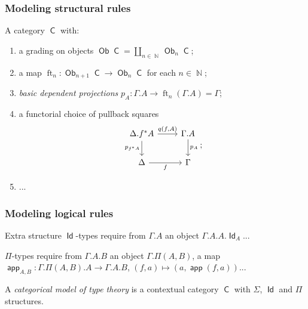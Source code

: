 \documentclass{beamer}
\DeclareMathOperator{\Id}{\mathsf{Id}}
\DeclareMathOperator{\sfC}{\mathsf{C}}
\DeclareMathOperator{\N}{\mathbb{N}}
\DeclareMathOperator{\Ob}{\mathsf{Ob}}
\DeclareMathOperator{\ft}{ft}
\DeclareMathOperator{\app}{\mathsf{app}}
\begin{document}
\begin{frame}
  \frametitle{Modeling structural rules}

  \begin{definition}
    A category $\sfC$ with:
    \begin{enumerate}
      \item a grading on objects $\Ob\sfC=\coprod_{n\in\N}\Ob_n\sfC$;
      \item a map $\ft_n\colon\Ob_{n+1}\sfC\rightarrow\Ob_n\sfC$ for each
        $n\in\N$;
      \item \emph{basic dependent projections}
        $p_A\colon\Gamma.A\rightarrow\ft_n(\Gamma.A)=\Gamma$;
      \item a functorial choice of pullback squares
        \[\begin{tikzcd}[ampersand replacement=\&]
          {\Delta.f^*A} \& {\Gamma.A} \\
          \Delta \& \Gamma
          \arrow["{p_A}", from=1-2, to=2-2]
          \arrow["{p_{f^*A}}"', from=1-1, to=2-1]
          \arrow["{q(f,A)}", from=1-1, to=1-2]
          \arrow["f"', from=2-1, to=2-2]
        \end{tikzcd};\]
      \item ...
    \end{enumerate}
  \end{definition}
\end{frame}

\begin{frame}
  \frametitle{Modeling logical rules}

  \begin{block}{Extra structure}
    $\Id$-types require from $\Gamma.A$ an object $\Gamma.A.A.\Id_A$...
    
    $\Pi$-types require from $\Gamma.A.B$ an object $\Gamma.\Pi(A,B)$, a map
    $\app_{A,B}\colon\Gamma.\Pi(A,B).A\rightarrow\Gamma.A.B$,
    $(f,a)\mapsto(a,\app(f,a))$...
  \end{block}
  \pause

  \begin{defn}
    A \emph{categorical model of type theory} is a contextual category $\sfC$
    with $\Sigma$, $\Id$ and $\Pi$ structures.
  \end{defn}
\end{frame}
\end{document}
